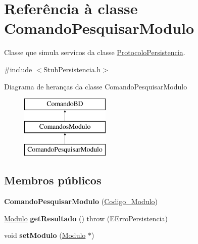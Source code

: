 \hypertarget{class_comando_pesquisar_modulo}{
\section{\-Referência à classe \-Comando\-Pesquisar\-Modulo}
\label{class_comando_pesquisar_modulo}
}


\-Classe que simula servicos da classe \hyperlink{class_protocolo_persistencia}{\-Protocolo\-Persistencia}.  




{\ttfamily \#include $<$\-Stub\-Persistencia.\-h$>$}

\-Diagrama de heranças da classe \-Comando\-Pesquisar\-Modulo\begin{figure}[H]
\begin{center}
\leavevmode
\includegraphics[height=3.000000cm]{class_comando_pesquisar_modulo}
\end{center}
\end{figure}
\subsection*{\-Membros públicos}
\begin{DoxyCompactItemize}
\item 
\hypertarget{class_comando_pesquisar_modulo_a1cdd1a5e94d6977f17c92c5a2817f01f}{
{\bfseries \-Comando\-Pesquisar\-Modulo} (\hyperlink{class_codigo___modulo}{\-Codigo\-\_\-\-Modulo})}
\label{class_comando_pesquisar_modulo_a1cdd1a5e94d6977f17c92c5a2817f01f}

\item 
\hypertarget{class_comando_pesquisar_modulo_ae5e974173283bf89dff35c81eca8c7b1}{
\hyperlink{class_modulo}{\-Modulo} {\bfseries get\-Resultado} ()  throw (\-E\-Erro\-Persistencia)}
\label{class_comando_pesquisar_modulo_ae5e974173283bf89dff35c81eca8c7b1}

\item 
\hypertarget{class_comando_pesquisar_modulo_ad1e4b312891e1c33be96de1409a0a1a4}{
void {\bfseries set\-Modulo} (\hyperlink{class_modulo}{\-Modulo} $\ast$)}
\label{class_comando_pesquisar_modulo_ad1e4b312891e1c33be96de1409a0a1a4}

\end{DoxyCompactItemize}



